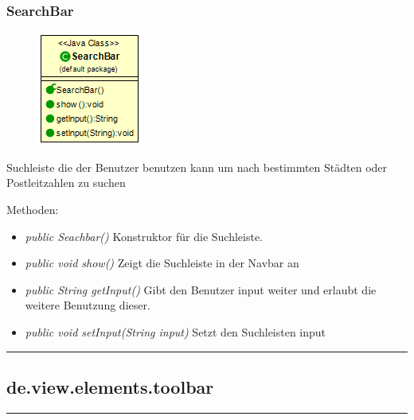\subsubsection{SearchBar}
\begin{minipage}{0.3\textwidth}
    \begin{figure}[H]
        {\centering\includegraphics[scale = 0.65]{media/view/navbar/Searchbar_Class.png}}
    \end{figure}
    \end{minipage} \hfill
    \begin{minipage}{0.6\textwidth}
Suchleiste die der Benutzer benutzen kann um nach bestimmten Städten oder Postleitzahlen zu suchen
\end{minipage}
Methoden: \begin{itemize} [noitemsep]
    \item \emph{public Seachbar()} Konstruktor für die Suchleiste.
    \item \emph{public void show()}  Zeigt die Suchleiste in der Navbar an
    \item \emph{public String getInput()} Gibt den Benutzer input weiter und erlaubt die weitere Benutzung dieser.
    \item \emph{public void setInput(String input)} Setzt den Suchleisten input
\end{itemize}

\rule{\textwidth}{0.4pt}
\subsection{de.view.elements.toolbar}

\rule{\textwidth}{0.4pt}
